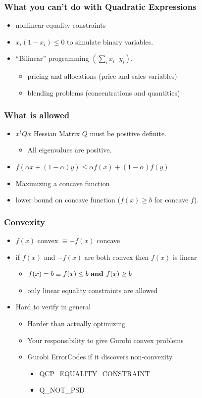 \documentclass[12pt,handout]{beamer}
\begin{document}
\begin{frame}
\frametitle{What you can't do with Quadratic Expressions}
\begin{itemize}
  \item nonlinear equality constraints
  \item $x_i (1-x_i) \le 0$ to simulate binary variables.
  \item ``Bilinear'' programming $(\sum_i x_i \cdot y_i)$.
    \begin{itemize}
      \item pricing and allocations (price and sales variables)
      \item blending problems (concentrations and quantities)
    \end{itemize}
\end{itemize}
\end{frame}

\begin{frame}
\frametitle{What is allowed}
\begin{itemize}
  \item $x^tQx$ Hessian Matrix $Q$ must be positive definite.
    \begin{itemize}
      \item All eigenvalues are positive.
    \end{itemize}
  \item $f(\alpha x + (1-\alpha) y) \le \alpha f( x ) + (1-\alpha) f(y)$
  \item Maximizing a concave function
  \item lower bound on concave function ($f(x) \ge b$ for concave $f$).
\end{itemize}
\end{frame}

\begin{frame}
  \frametitle{Convexity}
  \begin{itemize}
    \item $f(x)$ convex $\equiv -f(x)$ concave
    \item if $f(x)$ and $-f(x)$ are both convex then $f(x)$ is linear
      \begin{itemize}
        \item $f(x) = b \equiv f(x) \le b \mbox{\ \bf and } f(x) \ge b$
        \item only linear equality constraints are allowed
      \end{itemize}
    \item Hard to verify in general
      \begin{itemize}
        \item Harder than actually optimizing
        \item Your responsibility to give Gurobi convex problems
        \item Gurobi ErrorCodes if it discovers non-convexity
          \begin{itemize}
            \item QCP\_EQUALITY\_CONSTRAINT
            \item Q\_NOT\_PSD
          \end{itemize}
      \end{itemize}
  \end{itemize}
\end{frame}
\end{document}
